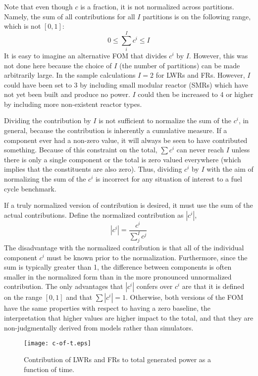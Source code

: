 \documentclass{ntmanuscript}
\begin{document}
Note that even though $c$ is a fraction, it is not normalized across
partitions. Namely, the sum of all contributions for all $I$ partitions
is on the following range, which is not $[0, 1]$:
\begin{equation}
\label{sum-c-range}
0 \le \sum_i^I c^i \le I
\end{equation}
It is easy to imagine an alternative FOM that divides $c^i$ by $I$. However,
this was not done here because the choice of $I$ (the number of partitions)
can be made arbitrarily large.  In the sample calculations $I=2$ for LWRs and
FRs.  However, $I$ could have been set to 3 by including small modular reactor
(SMRs) which have not yet been built and produce no power.  $I$ could then be
increased to 4 or higher by including more non-existent reactor types.

Dividing the contribution by $I$ is not sufficient to
normalize the sum of the $c^i$, in general, because the
contribution is inherently a cumulative measure. If a component ever had a
non-zero value, it will always be seen to have contributed something.
Because of this constraint on the total, $\sum c^i$ can never
reach $I$ unless there is only a single component or the
total is zero valued everywhere (which implies that the constituents are also
zero). Thus, dividing $c^i$ by $I$ with the aim of normalizing the
sum of the $c^i$ is incorrect for any situation of interest to a fuel
cycle benchmark.

If a truly normalized version of contribution is desired, it must
use the sum of the actual contributions. Define the normalized contribution
as $|c^i|$,
\begin{equation}
\label{norm-ci}
\left|c^i\right| = \frac{c^i}{\sum_j^I c^j}
\end{equation}
The disadvantage with the normalized contribution is that all of the
individual component $c^i$ must be known prior to the normalization.
Furthermore, since the sum is typically greater than 1, the difference
between components is often smaller in the normalized form than in the
more pronounced unnormalized contribution.
The only advantages that $|c^i|$ confers over $c^i$ are that it is defined on
the range $[0,1]$ and that $\sum |c^i| = 1$. Otherwise, both versions of the FOM
have the same properties with respect to having a zero baseline, the
interpretation that higher values are higher impact to the total, and that they
are non-judgmentally derived from models rather than simulators.

\begin{figure}[htb]
\centering
\texttt{[image: c-of-t.eps]}
\caption{Contribution of LWRs and FRs to total generated power as a
function of time.}
\label{c-of-t}
\end{figure}
\end{document}
